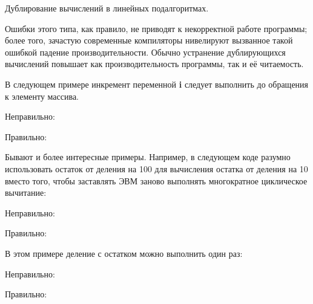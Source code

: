 \begin{typerror}
	\label{TE_duplicate-calculations}
	Дублирование вычислений в линейных подалгоритмах.

	Ошибки этого типа, как правило, не приводят к некорректной работе программы;
	более того, зачастую современные компиляторы нивелируют вызванное такой ошибкой падение производительности.
	Обычно устранение дублирующихся вычислений повышает как производительность программы, так и её читаемость.

	В следующем примере инкремент переменной \textbf{i} следует выполнить до обращения к элементу массива.

	Неправильно:

	Правильно:

	Бывают и более интересные примеры.
	Например, в следующем коде разумно использовать остаток от деления на 100 для вычисления остатка от деления на 10 вместо того, чтобы заставлять ЭВМ заново выполнять многократное циклическое вычитание:

	Неправильно:

	Правильно:

	В этом примере деление с остатком можно выполнить один раз:

	Неправильно:

	Правильно:

	
\end{typerror}
